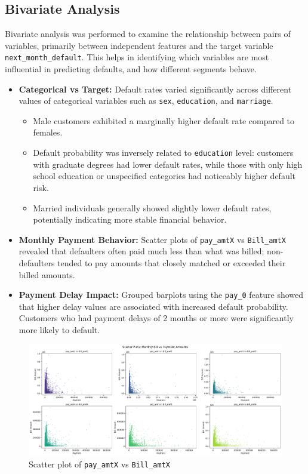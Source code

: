 \documentclass[12pt,a4paper]{article}
\begin{document}
\subsection{Bivariate Analysis}
Bivariate analysis was performed to examine the relationship between pairs of variables, primarily between independent features and the target variable \texttt{next\_month\_default}. This helps in identifying which variables are most influential in predicting defaults, and how different segments behave.
\begin{itemize}
    \item \textbf{Categorical vs Target:} Default rates varied significantly across different values of categorical variables such as \texttt{sex}, \texttt{education}, and \texttt{marriage}.
    \begin{itemize}
        \item Male customers exhibited a marginally higher default rate compared to females.
        \item Default probability was inversely related to \texttt{education} level: customers with graduate degrees had lower default rates, while those with only high school education or unspecified categories had noticeably higher default risk.
        \item Married individuals generally showed slightly lower default rates, potentially indicating more stable financial behavior.
    \end{itemize}
    \item \textbf{Monthly Payment Behavior:} Scatter plots of \texttt{pay\_amtX} vs \texttt{Bill\_amtX} revealed that defaulters often paid much less than what was billed; non-defaulters tended to pay amounts that closely matched or exceeded their billed amounts.
    \item \textbf{Payment Delay Impact:} Grouped barplots using the \texttt{pay\_0} feature showed that higher delay values are associated with increased default probability. Customers who had payment delays of 2 months or more were significantly more likely to default.
\end{itemize}
\begin{figure}[H]
    \centering
    \includegraphics[width=1\textwidth]{figures/3.png}
    \caption{Scatter plot of \texttt{pay\_amtX} vs \texttt{Bill\_amtX}}
\end{figure}
\end{document}

